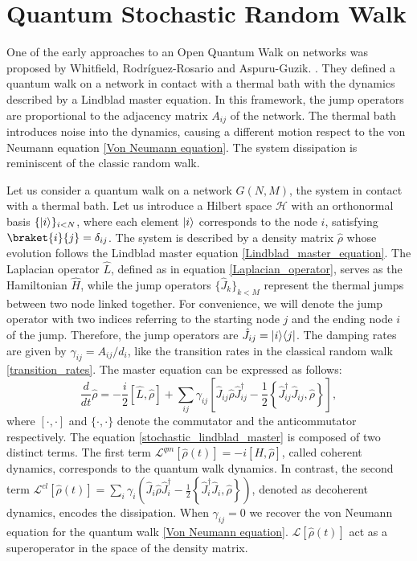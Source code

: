 \section{Quantum Stochastic Random Walk}\label{C_Quantum Stochastic Walk}

One of the early approaches to an Open Quantum Walk on networks was proposed by Whitfield, Rodr\'iguez-Rosario and Aspuru-Guzik. \cite{QSW}. They defined a quantum walk on a network in contact with a thermal bath with the dynamics described by a Lindblad master equation. In this framework, the jump operators are proportional to the adjacency matrix $A_{ij}$ of the network. The thermal bath introduces noise into the dynamics, causing a different motion respect to the von Neumann equation \eqref{Von Neumann equation}. The system dissipation is reminiscent of the classic random walk.

Let us consider a quantum walk on a network $G(N,M)$, the system in contact with a thermal bath.
Let us introduce a Hilbert space $\mathcal{H}$ with an orthonormal basis $\{\lvert i\rangle\}_{i<N}$, where each element $\lvert i\rangle$ corresponds to the node $i$, satisfying $\braket{i}{j}=\delta_{ij}$. The system is described by a density matrix $\hat \rho$ whose evolution follows the Lindblad master equation \eqref{Lindblad_master_equation}.
The Laplacian operator $\hat L$, defined as in equation \eqref{Laplacian_operator}, serves as the Hamiltonian $\hat H$, while the jump operators $\{\hat J_k\}_{k<M}$ represent the thermal jumps between two node linked together. For convenience, we will denote the jump operator with two indices referring to the starting node $j$ and the ending node $i$ of the jump. Therefore, the jump operators are $\hat J_{ij} = \lvert i\rangle\langle j\rvert$. The damping rates are given by $\gamma_{ij} =A_{ij}/d_i$, like the transition rates in the classical random walk \eqref{transition_rates}.
The master equation can be expressed as follows:
\begin{equation}\label{stochastic_lindblad_master}
    \frac{d}{dt}\hat \rho = -\frac{i}{2}\left[\hat L,\hat\rho\right] + \sum_{ij}\gamma_{ij}\left[\hat J_{ij} \hat\rho\hat J_{ij}^\dagger -\frac{1}{2} \left\{ \hat J_{ij}^\dagger \hat J_{ij}, \hat\rho\right\}\right],
\end{equation}
where $[\cdot,\cdot]$ and $\{\cdot,\cdot\}$ denote the commutator and the anticommutator respectively.
The equation \eqref{stochastic_lindblad_master} is composed of two distinct terms. 
The first term $\mathcal{L}^{qm}\left[\hat\rho(t)\right] = -i\left[H,\hat\rho\right]$, called coherent dynamics, corresponds to the quantum walk dynamics. In contrast, the second term  $\mathcal{L}^{cl}\left[\hat\rho(t)\right] = \sum_i \gamma_i \left(\hat J_i \hat\rho \hat J^\dagger_i - \frac{1}{2}\left\{ \hat J^\dagger_i\hat J_i, \hat\rho\right\} \right)$, denoted as decoherent dynamics, encodes the dissipation. 
When $\gamma_{ij} = 0$ we recover the von Neumann equation for the quantum walk \eqref{Von Neumann equation}. 
$\mathcal{L}\left[\hat\rho(t)\right]$ act as a superoperator in the space of the density matrix.

